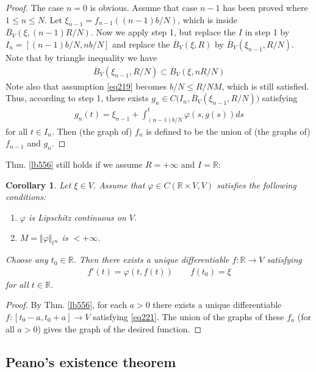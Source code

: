 \documentclass[12pt,b5paper,notitlepage]{article}
\theoremstyle{definition}
\theoremstyle{plain}
\newtheorem{co}[df]{Corollary}
\newcommand{\ovl}{\overline}
\newcommand{\Rbb}{\mathbb R}
\newcommand{\dps}{\displaystyle}
\numberwithin{equation}{section}
\begin{document}
\begin{proof}
The case $n=0$ is obvious. Assume that case $n-1$ has been proved where $1\leq n\leq N$. Let $\xi_{n-1}=f_{n-1}((n-1)b/N)$, which is inside $\ovl B_V(\xi,(n-1)R/N)$. Now we apply step 1, but replace the $I$ in step 1 by $I_n=[(n-1)b/N,nb/N]$ and replace the $\ovl B_V(\xi,R)$ by $\ovl B_V(\xi_{n-1},R/N)$. Note that by triangle inequality we have
\begin{align*}
\ovl B_V(\xi_{n-1},R/N)\subset \ovl B_V(\xi,nR/N)
\end{align*}
Note also that assumption \eqref{eq219} becomes $b/N\leq R/NM$, which is still satisfied. Thus, according to step 1, there exists $\dps g_n\in C\big(I_n,\ovl B_V(\xi_{n-1},R/N)\big)$ satisfying
\begin{align*}
g_n(t)=\xi_{n-1}+\int_{(n-1)b/N}^t \varphi(s,g(s))ds
\end{align*}
for all $t\in I_n$. Then (the graph of) $f_n$ is defined to be the union of (the graphs of) $f_{n-1}$ and $g_n$.
\end{proof}


Thm. \ref{lb556} still holds if we assume $R=+\infty$ and $I=\Rbb$:

\begin{co}\label{lb558}
Let $\xi\in V$. Assume that $\varphi\in C(\Rbb\times V,V)$ satisfies the following conditions:
\begin{enumerate}[label=(\arabic*)]
\item $\varphi$ is Lipschitz continuous on $V$.
\item $M=\Vert\varphi\Vert_{l^\infty}$ is $<+\infty$.
\end{enumerate}
Choose any $t_0\in\Rbb$. Then there exists a unique differentiable $f:\Rbb\rightarrow V$ satisfying
\begin{align}
f'(t)=\varphi(t,f(t))\qquad f(t_0)=\xi \label{eq221}
\end{align}
for all $t\in\Rbb$.
\end{co}

\begin{proof}
By Thm. \ref{lb556}, for each $a>0$ there exists a unique differentiable $f:[t_0-a,t_0+a]\rightarrow V$ satisfying \eqref{eq221}. The union of the graphs of these $f_a$ (for all $a>0$) gives the graph of the desired function.
\end{proof}






\subsection{Peano's existence theorem}
\end{document}
